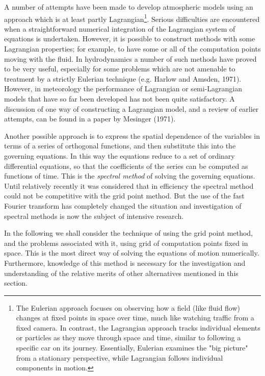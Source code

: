 A number of attempts have been made to develop atmospheric models using an approach which is at least partly Lagrangian\footnote{The Eulerian approach focuses on observing how a field (like fluid flow) changes at fixed points in space over time, much like watching traffic from a fixed camera. In contrast, the Lagrangian approach tracks individual elements or particles as they move through space and time, similar to following a specific car on its journey. Essentially, Eulerian examines the "big picture" from a stationary perspective, while Lagrangian follows individual components in motion.}. Serious difficulties are encountered when a straightforward numerical integration of the Lagrangian system of equations is undertaken. However, it is possible to construct methods with some Lagrangian properties; for example, to have some or all of the compu­tation points moving with the fluid. In hydrodynamics a number of such methods have proved to be very useful, especially for some problems which are not amenable to treatment by a strictly Eulerian technique (e.g. Harlow and Amsden, 1971). However, in meteorology the per­formance of Lagrangian or semi-Lagrangian models that have so far been developed has not been quite satis­factory. A discussion of one way of constructing a Lagrangian model, and a review of earlier attempts, can be found in a paper by Mesinger (1971).

Another possible approach is to express the spatial dependence of the variables in terms of a series of ortho­gonal functions, and then substitute this into the governing equations. In this way the equations reduce to a set of ordinary differential equations, so that the coefficients of the series can be computed as functions of time. This is the \textit{spectral method} of solving the governing equations. Until relatively recently it was considered that in effi­ciency the spectral method could not be competitive with the grid point method. But the use of the fast Fourier transform has completely changed the situation and investigation of spectral methods is now the subject of intensive research.

In the following we shall consider the technique of using the grid point method, and the problems associated with it, using grid of computation points fixed in space. This is the most direct way of solving the equations of motion numerically. Furthermore, knowledge of this method is necessary for the investigation and understanding of the relative merits of other alternatives mentioned in this section.
